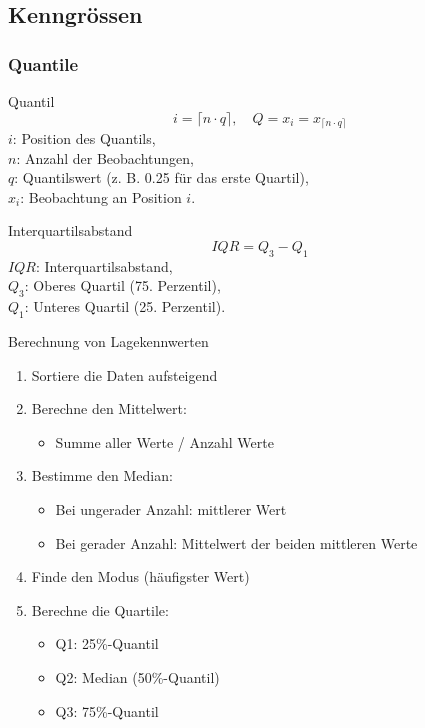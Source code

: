 \subsection{Kenngrössen}

\subsubsection{Quantile}

\begin{minipage}{0.5\columnwidth}
\begin{definition}{Quantil}
$$
i=\lceil n \cdot q\rceil, \quad Q=x_{i}=x_{\lceil n \cdot q\rceil}
$$
$i$: Position des Quantils, \\
$n$: Anzahl der Beobachtungen, \\
$q$: Quantilswert (z. B. 0.25 für das erste Quartil), \\
$x_{i}$: Beobachtung an Position $i$.
\end{definition}
\end{minipage}
\begin{minipage}{0.5\columnwidth}
\begin{definition}{Interquartilsabstand}
$$
I Q R=Q_{3}-Q_{1}
$$
$IQR$: Interquartilsabstand, \\
$Q_{3}$: Oberes Quartil (75. Perzentil), \\
$Q_{1}$: Unteres Quartil (25. Perzentil).
\end{definition}
\end{minipage}

\begin{KR}{Berechnung von Lagekennwerten}
\begin{enumerate}
    \item Sortiere die Daten aufsteigend
    \item Berechne den Mittelwert:
        \begin{itemize}
            \item Summe aller Werte / Anzahl Werte
        \end{itemize}
    \item Bestimme den Median:
        \begin{itemize}
            \item Bei ungerader Anzahl: mittlerer Wert
            \item Bei gerader Anzahl: Mittelwert der beiden mittleren Werte
        \end{itemize}
    \item Finde den Modus (häufigster Wert)
    \item Berechne die Quartile:
        \begin{itemize}
            \item Q1: 25\%-Quantil
            \item Q2: Median (50\%-Quantil)
            \item Q3: 75\%-Quantil
        \end{itemize}
\end{enumerate}
\end{KR}

